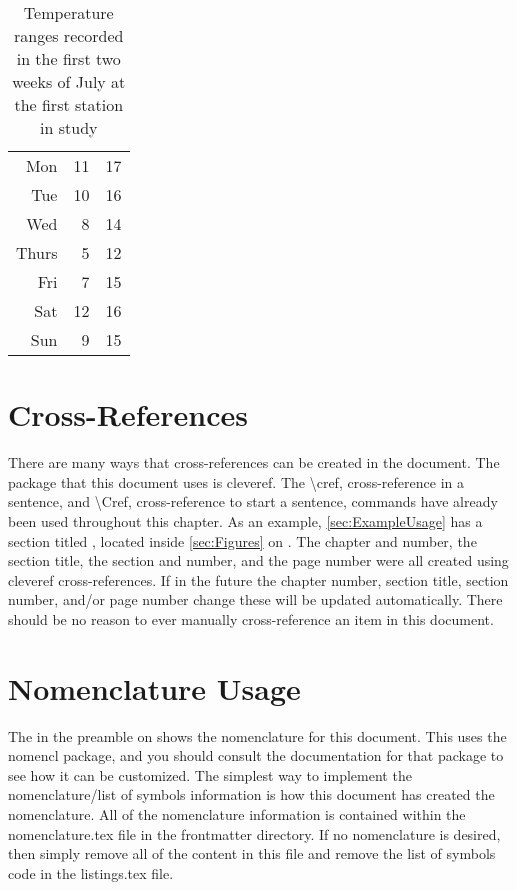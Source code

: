 \begin{table}
\begin{subtable}[h]{0.375\textwidth}
\begin{tabular}{r r r}
                Mon   & 11 & 17 \\
                Tue   & 10 & 16 \\
                Wed   & 8  & 14 \\
                Thurs & 5  & 12 \\
                Fri   & 7  & 15 \\
                Sat   & 12 & 16 \\
                Sun   & 9  & 15 \\
                \hline
            \end{tabular}
        \end{subtable}
        \captionsetup{width=4.6in}
        \caption{Temperature ranges recorded in the first two weeks of July at the first station in study}
        \label{tab:temps}
    \end{table}

\section{Cross-References} \label{sec:CrossReferences}
    There are many ways that cross-references can be created in the document.
    The package that this document uses is cleveref.
    The \textbackslash cref, cross-reference in a sentence, and \textbackslash Cref, cross-reference to start a sentence, commands have already been used throughout this chapter.
    As an example, \cref{sec:ExampleUsage} has a section titled , located inside \cref{sec:Figures} on .
    The chapter and number, the section title, the section and number, and the page number were all created using cleveref cross-references.
    If in the future the chapter number, section title, section number, and/or page number change these will be updated automatically.
    There should be no reason to ever manually cross-reference an item in this document.

\section{Nomenclature Usage} \label{sec:NomenclatureUsage}
    The  in the preamble on  shows the nomenclature for this document.
    This uses the nomencl package, and you should consult the documentation for that package to see how it can be customized.
    The simplest way to implement the nomenclature/list of symbols information is how this document has created the nomenclature.
    All of the nomenclature information is contained within the nomenclature.tex file in the frontmatter directory.
    If no nomenclature is desired, then simply remove all of the content in this file and remove the list of symbols code in the listings.tex file.

